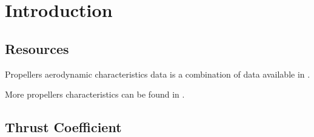 \chapter{Introduction}

\section{Resources}

Propellers aerodynamic characteristics data is a combination of data available in \cite{Prop-NACA-TR-594, Prop-NACA-TR-640, Prop-NACA-TR-641}.

More propellers characteristics can be found in \cite{Prop-NACA-TR-642, Prop-NACA-TR-643, Prop-NACA-TR-650, Prop-NACA-TR-658, Prop-NACA-TR-684, Prop-ARC-1673, Prop-Weinig1940, Prop-Kravec1941}.

\section{Thrust Coefficient}
